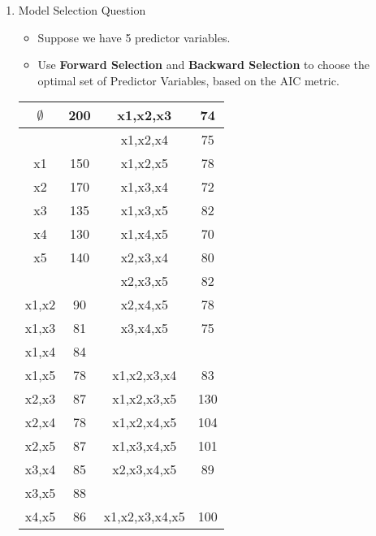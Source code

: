 \documentclass[]{report}
\begin{document}
\begin{enumerate}
\newpage
\item Model Selection Question

\begin{itemize}
\item Suppose we have 5 predictor variables.
\item Use \textbf{Forward Selection} and \textbf{Backward Selection} to choose the optimal set of Predictor Variables, based on the AIC metric.
\end{itemize}
{
	\large
	\begin{center}
\begin{tabular}{|c|c|c|c|}
	\hline
$\emptyset$	&	200	&	x1,x2,x3	&	74	\\ \hline
\phantom{makespace}
 &	\phantom{makespace}
 	&	x1,x2,x4	&	75	\\ \hline
x1	&	150	&	x1,x2,x5	&	78	\\ \hline
x2	&	170	&	x1,x3,x4	&	72	\\ \hline
x3	&	135	&	x1,x3,x5	&	82	\\ \hline
x4	&	130	&	x1,x4,x5	&	70	\\ \hline
x5	&	140	&	x2,x3,x4	&	80	\\ \hline
&		&	x2,x3,x5	&	82	\\ \hline
x1,x2	&	90	&	x2,x4,x5	&	78	\\ \hline
x1,x3	&	81	&	x3,x4,x5	&	75	\\ \hline
x1,x4	&	84	&	\phantom{makespace}
	&	\phantom{makespace}
		\\ \hline
x1,x5	&	78	&	x1,x2,x3,x4	&	83	\\ \hline
x2,x3	&	87	&	x1,x2,x3,x5	&	130	\\ \hline
x2,x4	&	78	&	x1,x2,x4,x5	&	104	\\ \hline
x2,x5	&	87	&	x1,x3,x4,x5	&	101	\\ \hline
x3,x4	&	85	&	x2,x3,x4,x5	&	89	\\ \hline
x3,x5	&	88	&		&		\\ \hline
x4,x5	&	86	&	x1,x2,x3,x4,x5	&	100	\\ \hline
		\end{tabular} 
	\end{center}
}
\end{enumerate}
\end{document}
